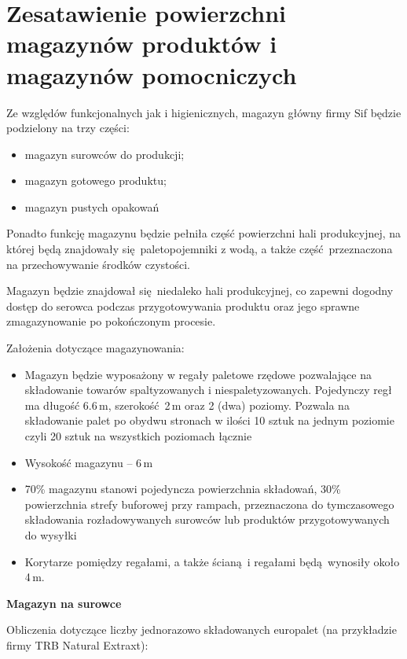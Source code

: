 \section{Zesatawienie powierzchni magazynów produktów i magazynów pomocniczych}

Ze względów funkcjonalnych jak i higienicznych, magazyn główny firmy \textsf{Sif} będzie podzielony na trzy części:
\begin{itemize}
	\item magazyn surowców do produkcji;
	\item magazyn gotowego produktu;
	\item magazyn pustych opakowań
\end{itemize}

Ponadto funkcję magazynu będzie pełniła część powierzchni hali produkcyjnej, na której będą znajdowały się paletopojemniki z wodą, a także część przeznaczona na przechowywanie środków czystości.

Magazyn będzie znajdował się niedaleko hali produkcyjnej, co zapewni dogodny dostęp do serowca podczas przygotowywania produktu oraz jego sprawne zmagazynowanie po pokończonym procesie.

Założenia dotyczące magazynowania:
\begin{itemize}
	\item Magazyn będzie wyposażony w regały paletowe rzędowe pozwalające na składowanie towarów spaltyzowanych i niespaletyzowanych. Pojedynczy regł ma długość 6.6\,m, szerokość 2\,m oraz 2 (dwa) poziomy. Pozwala na składowanie palet po obydwu stronach w ilości 10 sztuk na jednym poziomie czyli 20 sztuk na wszystkich poziomach łącznie
	\item Wysokość magazynu -- 6\,m
	\item 70\% magazynu stanowi pojedyncza powierzchnia składowań, 30\% powierzchnia strefy buforowej przy rampach, przeznaczona do tymczasowego składowania rozładowywanych surowców lub produktów przygotowywanych do wysyłki
	\item Korytarze pomiędzy regałami, a także ścianą i regałami będą wynosiły około 4\,m.
\end{itemize}\vspace{\baselineskip}

\textbf{Magazyn na surowce}

Obliczenia dotyczące liczby jednorazowo składowanych europalet (na przykładzie firmy \textsf{TRB Natural Extraxt}):

